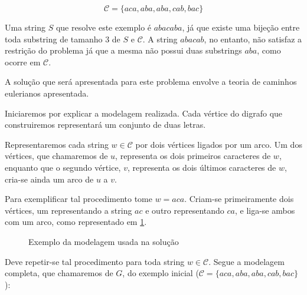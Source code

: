 \documentclass[12pt, a4paper]{article}
\begin{document}
        \[\mathcal{C} = \{aca, aba, aba, cab, bac\}\]

        Uma string $S$ que resolve este exemplo é $abacaba$, já que existe uma bijeção entre toda substring de tamanho 3 de $S$ e $\mathcal{C}$.
        A string $abacab$, no entanto, não satisfaz a restrição do problema já que a mesma não possui duas substrings $aba$, como ocorre em $\mathcal{C}$.

        A solução que será apresentada para este problema envolve a teoria de caminhos eulerianos apresentada.

        Iniciaremos por explicar a modelagem realizada. Cada vértice do digrafo que construiremos representará um conjunto de duas letras. 
        
        Representaremos cada string $w \in \mathcal{C}$ por dois vértices ligados por um arco. Um dos vértices, que chamaremos de $u$, representa os dois primeiros caracteres de $w$, enquanto que o segundo vértice, $v$, representa os dois últimos caracteres de $w$, cria-se ainda um arco de $u$ a $v$.

        Para exemplificar tal procedimento tome $w = aca$. Criam-se primeiramente dois vértices, um representando a string $ac$ e outro representando $ca$, e liga-se ambos com um arco, como representado em \ref{fig:tanya}.

        \begin{figure}[H]
            \centering

            \caption{Exemplo da modelagem usada na solução}
            \label{fig:tanya}
        \end{figure}

        \sloppy Deve repetir-se tal procedimento para toda string $w \in \mathcal{C}$. Segue a modelagem completa, que chamaremos de $G$, do exemplo inicial ($\mathcal{C} = \{aca, aba, aba, cab, bac\}$):
       
\end{document}
